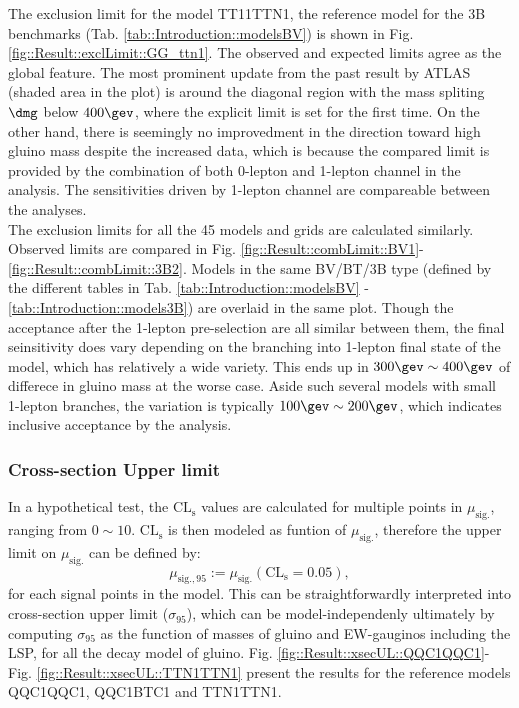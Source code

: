 The exclusion limit for the model TT11TTN1, the reference model for the 3B benchmarks (Tab. \ref{tab::Introduction::modelsBV}) is shown in Fig. \ref{fig::Result::exclLimit::GG_ttn1}. The observed and expected limits agree as the global feature. The most prominent update from the past result \cite{strong3B_ICHEP2016_CONF} by ATLAS (shaded area in the plot) is around the diagonal region with the mass spliting $\dmg$ below $400\gev$, where the explicit limit is set for the first time. On the other hand, there is seemingly no improvedment in the direction toward high gluino mass despite the increased data, which is because the compared limit is provided by the combination of both 0-lepton and 1-lepton channel in the analysis. The sensitivities driven by 1-lepton channel are compareable between the analyses. \\


The exclusion limits for all the 45 models and grids are calculated similarly. Observed limits are compared in Fig. \ref{fig::Result::combLimit::BV1}-\ref{fig::Result::combLimit::3B2}. Models in the same BV/BT/3B type (defined by the different tables in Tab. \ref{tab::Introduction::modelsBV} - \ref{tab::Introduction::models3B}) are overlaid in the same plot. Though the acceptance after the 1-lepton pre-selection are all similar between them, the final seinsitivity does vary depending on the branching into 1-lepton final state of the model, which has relatively a wide variety. This ends up in $300\gev\sim400\gev$ of differece in gluino mass at the worse case. Aside such several models with small 1-lepton branches, the variation is typically $100\gev\sim200\gev$, which indicates inclusive acceptance by the analysis.




\clearpage
\subsubsection{Cross-section Upper limit}
In a hypothetical test, the $\mathrm{CL_s}$ values are calculated for multiple points in $\mu_{\mathrm{sig.}}$, ranging from $0\sim10$. $\mathrm{CL_s}$ is then modeled as funtion of $\mu_{\mathrm{sig.}}$, therefore the upper limit on $\mu_{\mathrm{sig.}}$ can be defined by:
$$
\mu_{\mathrm{sig.},95} := \mu_{\mathrm{sig.}}(\mathrm{CL_s}=0.05),
$$
for each signal points in the model.
This can be straightforwardly interpreted into cross-section upper limit ($\sigma_{95}$), which can be model-independenly ultimately by computing $\sigma_{95}$ as the function of masses of gluino and EW-gauginos including the LSP, for all the decay model of gluino. Fig. \ref{fig::Result::xsecUL::QQC1QQC1}-Fig. \ref{fig::Result::xsecUL::TTN1TTN1} present the results for the reference models QQC1QQC1, QQC1BTC1 and TTN1TTN1.








